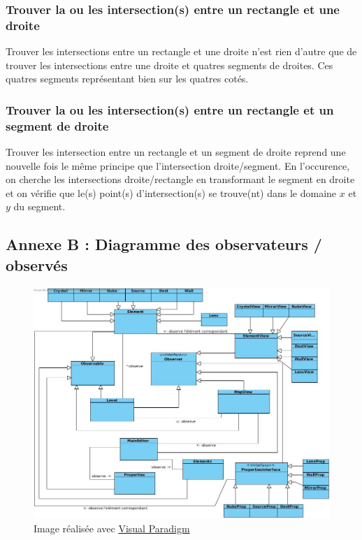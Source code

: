 \documentclass[]{report}
\begin{document}
\subsubsection{Trouver la ou les intersection(s) entre un rectangle et une droite}

Trouver les intersections entre un rectangle et une droite n'est rien d'autre que
de trouver les intersections entre une droite et quatres segments de droites. Ces quatres segments
représentant bien sur les quatres cotés.

\subsubsection{Trouver la ou les intersection(s) entre un rectangle et un segment de droite}

Trouver les intersection entre un rectangle et un segment de droite 
reprend une nouvelle fois le même principe que l'intersection droite/segment.
En l'occurence, on cherche les intersections droite/rectangle en transformant
le segment en droite et on vérifie que le(s) point(s) d'intersection(s) se trouve(nt)
dans le domaine $x$ et $y$ du segment.

\newpage 
\subsection{\label{AnnexeB}Annexe B : Diagramme des observateurs / observés}

\begin{figure}[hb]
\centering
\includegraphics[scale=0.4]{Obs.jpg}
\caption{Image réalisée avec \href{http://www.visual-paradigm.com/}{Visual
	Paradigm}}
\end{figure}
\end{document}
